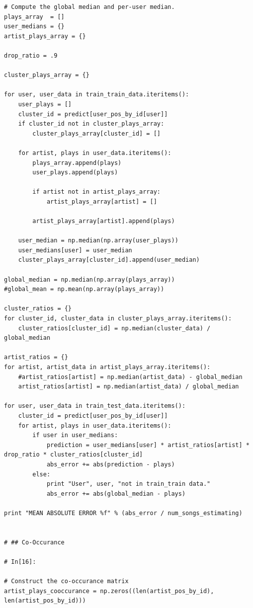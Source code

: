 \documentclass[11pt]{article}
\begin{document}
\begin{lstlisting}
# Compute the global median and per-user median.
plays_array  = []
user_medians = {}
artist_plays_array = {}

drop_ratio = .9

cluster_plays_array = {}

for user, user_data in train_train_data.iteritems():
    user_plays = []
    cluster_id = predict[user_pos_by_id[user]]
    if cluster_id not in cluster_plays_array:
        cluster_plays_array[cluster_id] = []
    
    for artist, plays in user_data.iteritems():
        plays_array.append(plays)
        user_plays.append(plays)
        
        if artist not in artist_plays_array:
            artist_plays_array[artist] = []
        
        artist_plays_array[artist].append(plays)
        
    user_median = np.median(np.array(user_plays))
    user_medians[user] = user_median
    cluster_plays_array[cluster_id].append(user_median)
    
global_median = np.median(np.array(plays_array))
#global_mean = np.mean(np.array(plays_array))

cluster_ratios = {}
for cluster_id, cluster_data in cluster_plays_array.iteritems():
    cluster_ratios[cluster_id] = np.median(cluster_data) / global_median

artist_ratios = {}
for artist, artist_data in artist_plays_array.iteritems():
    #artist_ratios[artist] = np.median(artist_data) - global_median
    artist_ratios[artist] = np.median(artist_data) / global_median
    
for user, user_data in train_test_data.iteritems():
    cluster_id = predict[user_pos_by_id[user]]
    for artist, plays in user_data.iteritems():
        if user in user_medians:
            prediction = user_medians[user] * artist_ratios[artist] * drop_ratio * cluster_ratios[cluster_id]
            abs_error += abs(prediction - plays) 
        else:
            print "User", user, "not in train_train data."
            abs_error += abs(global_median - plays)
            
print "MEAN ABSOLUTE ERROR %f" % (abs_error / num_songs_estimating)


# ## Co-Occurance

# In[16]:

# Construct the co-occurance matrix
artist_plays_cooccurance = np.zeros((len(artist_pos_by_id), len(artist_pos_by_id)))


\end{lstlisting}
\end{document}
